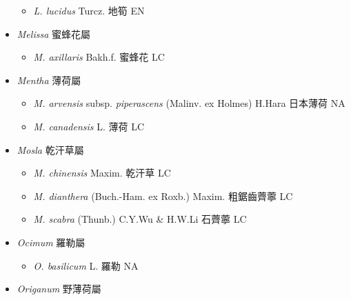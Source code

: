 \begin{itemize}
  \begin{itemize}
        \item[] \textit{L. lucidus} Turcz.  地筍   EN
  \end{itemize}
 \item[] \textit{Melissa} 蜜蜂花屬
                                
  \begin{itemize}
        \item[] \textit{M. axillaris} Bakh.f.  蜜蜂花   LC
  \end{itemize}
 \item[] \textit{Mentha} 薄荷屬
                                
  \begin{itemize}
        \item[] \textit{M. arvensis} subsp. \textit{piperascens} (Malinv. ex Holmes) H.Hara  日本薄荷   NA
        \item[] \textit{M. canadensis} L.  薄荷   LC
  \end{itemize}
 \item[] \textit{Mosla} 乾汗草屬
                                
  \begin{itemize}
        \item[] \textit{M. chinensis} Maxim.  乾汗草   LC
        \item[] \textit{M. dianthera} (Buch.-Ham. ex Roxb.) Maxim.  粗鋸齒薺薴   LC
        \item[] \textit{M. scabra} (Thunb.) C.Y.Wu \& H.W.Li  石薺薴   LC
  \end{itemize}
 \item[] \textit{Ocimum} 羅勒屬
                                
  \begin{itemize}
        \item[] \textit{O. basilicum} L.  羅勒   NA
  \end{itemize}
 \item[] \textit{Origanum} 野薄荷屬
                                

\end{itemize}
